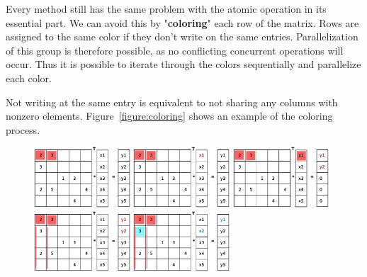 \documentclass[a4paper,11pt]{scrartcl}
\begin{document}
Every method still has the same problem with the atomic operation in its
essential part. We can avoid this by "\textbf{coloring}" each row of the matrix.
Rows are assigned to the same color if they don't write on the same entries.
Parallelization of this group is therefore possible, as no conflicting
concurrent operations will occur. Thus it is possible to iterate through the
colors sequentially and parallelize each color.

Not writing at the same entry is equivalent to not sharing any columns with
nonzero elements. Figure~\ref{figure:coloring} shows an example of the
coloring process.


\begin{figure}[ht]
\includegraphics[width=0.32\textwidth]{graphic/coloringT2.eps}\hfill\vline\hfill
\includegraphics[width=0.32\textwidth]{graphic/coloringT3.eps}\hfill\vline\hfill
\includegraphics[width=0.32\textwidth]{graphic/coloringT4.eps}
\includegraphics[width=0.32\textwidth]{graphic/coloringT5.eps}\hfill\vline\hfill
\includegraphics[width=0.32\textwidth]{graphic/coloringT6.eps}\hfill\vline\hfill

\end{figure}
\end{document}
